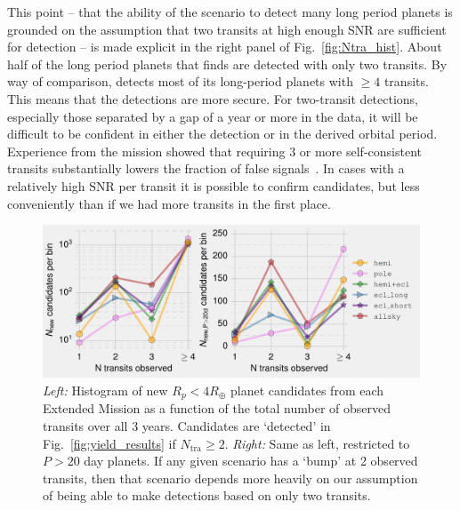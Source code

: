 \begin{enumerate}
	This point -- that the ability of the \hemis\:scenario to detect many long period planets is grounded on the assumption that two transits at high enough SNR are sufficient for detection -- is made explicit in the right panel of Fig.~\ref{fig:Ntra_hist}.
	About half of the long period planets that \hemis\:finds are detected with only two transits.
	By way of comparison, \npole\:detects most of its long-period planets with $\ge 4$ transits.
	This means that the \npole\:detections are more secure.
	For two-transit detections, especially those separated by a gap of a year or more in the \tess data, it will be
        difficult to be confident in either the detection or in the derived 
        orbital period.
    Experience from the \kepler mission showed that requiring 3 or more 
    self-consistent transits substantially lowers the fraction of false 
    signals~\citep{burke_Q1Q8_2014}.
	In cases with a relatively high SNR per transit it is possible to confirm 
	candidates, but less conveniently than if we had more transits in the first 
	place.
	\begin{figure}[!t]
		\centering
		\includegraphics{figures/Ntra_histogram.pdf}
		\caption{ \textit{Left:} Histogram of new $R_p<4R_\oplus$ planet 
		candidates from each Extended Mission as a function of the total number of 
		observed transits over all 3 years.
		Candidates are `detected' in Fig.~\protect\ref{fig:yield_results} if $N_\mathrm{tra}\geq2$.
		\textit{Right:} Same as left, restricted to $P>20$ day planets.
		If any given scenario has a `bump' at 2 observed transits, then that scenario depends more heavily on our assumption of being able to make detections based on only two transits.
}
\end{figure}
\end{enumerate}
